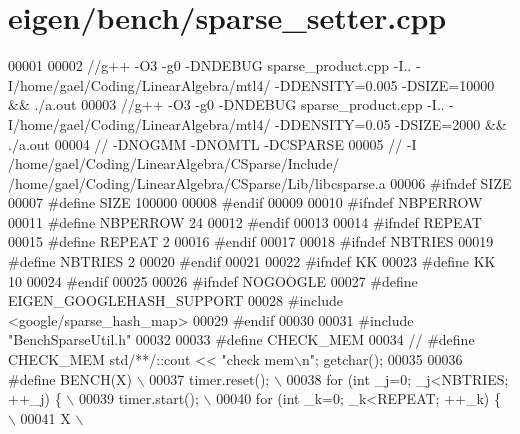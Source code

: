 \hypertarget{eigen_2bench_2sparse__setter_8cpp_source}{}\section{eigen/bench/sparse\+\_\+setter.cpp}
\label{eigen_2bench_2sparse__setter_8cpp_source}

\begin{DoxyCode}
00001 
00002 \textcolor{comment}{//g++ -O3 -g0 -DNDEBUG  sparse\_product.cpp -I.. -I/home/gael/Coding/LinearAlgebra/mtl4/ -DDENSITY=0.005
       -DSIZE=10000 && ./a.out}
00003 \textcolor{comment}{//g++ -O3 -g0 -DNDEBUG  sparse\_product.cpp -I.. -I/home/gael/Coding/LinearAlgebra/mtl4/ -DDENSITY=0.05
       -DSIZE=2000 && ./a.out}
00004 \textcolor{comment}{// -DNOGMM -DNOMTL -DCSPARSE}
00005 \textcolor{comment}{// -I /home/gael/Coding/LinearAlgebra/CSparse/Include/
       /home/gael/Coding/LinearAlgebra/CSparse/Lib/libcsparse.a}
00006 \textcolor{preprocessor}{#ifndef SIZE}
00007 \textcolor{preprocessor}{#define SIZE 100000}
00008 \textcolor{preprocessor}{#endif}
00009 
00010 \textcolor{preprocessor}{#ifndef NBPERROW}
00011 \textcolor{preprocessor}{#define NBPERROW 24}
00012 \textcolor{preprocessor}{#endif}
00013 
00014 \textcolor{preprocessor}{#ifndef REPEAT}
00015 \textcolor{preprocessor}{#define REPEAT 2}
00016 \textcolor{preprocessor}{#endif}
00017 
00018 \textcolor{preprocessor}{#ifndef NBTRIES}
00019 \textcolor{preprocessor}{#define NBTRIES 2}
00020 \textcolor{preprocessor}{#endif}
00021 
00022 \textcolor{preprocessor}{#ifndef KK}
00023 \textcolor{preprocessor}{#define KK 10}
00024 \textcolor{preprocessor}{#endif}
00025 
00026 \textcolor{preprocessor}{#ifndef NOGOOGLE}
00027 \textcolor{preprocessor}{#define EIGEN\_GOOGLEHASH\_SUPPORT}
00028 \textcolor{preprocessor}{#include <google/sparse\_hash\_map>}
00029 \textcolor{preprocessor}{#endif}
00030 
00031 \textcolor{preprocessor}{#include "BenchSparseUtil.h"}
00032 
00033 \textcolor{preprocessor}{#define CHECK\_MEM}
00034 \textcolor{comment}{// #define CHECK\_MEM  std/**/::cout << "check mem\(\backslash\)n"; getchar();}
00035 
00036 \textcolor{preprocessor}{#define BENCH(X) \(\backslash\)}
00037 \textcolor{preprocessor}{  timer.reset(); \(\backslash\)}
00038 \textcolor{preprocessor}{  for (int \_j=0; \_j<NBTRIES; ++\_j) \{ \(\backslash\)}
00039 \textcolor{preprocessor}{    timer.start(); \(\backslash\)}
00040 \textcolor{preprocessor}{    for (int \_k=0; \_k<REPEAT; ++\_k) \{ \(\backslash\)}
00041 \textcolor{preprocessor}{        X  \(\backslash\)}

\end{DoxyCode}
